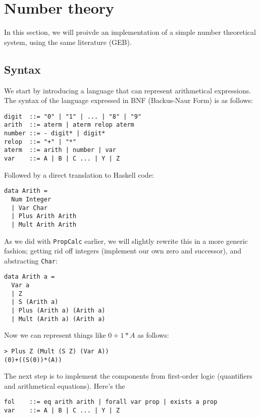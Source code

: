 \documentclass{article}
\begin{document}
\section{Number theory}

In this section, we will proivde an implementation of a simple number theoretical system, using the same literature (GEB).

\subsection{Syntax}

We start by introducing a language that can represent arithmetical expressions. The syntax of the language expressed in BNF (Backus-Naur Form) is as follows:

\begin{lstlisting}
digit  ::= "0" | "1" | ... | "8" | "9"
arith  ::= aterm | aterm relop aterm
number ::= - digit* | digit*
relop  ::= "+" | "*"
aterm  ::= arith | number | var
var    ::= A | B | C ... | Y | Z
\end{lstlisting}

Followed by a direct translation to Haskell code:

\begin{lstlisting}
data Arith =
  Num Integer
  | Var Char
  | Plus Arith Arith
  | Mult Arith Arith
\end{lstlisting}

As we did with \texttt{PropCalc} earlier, we will slightly rewrite this in a more generic fashion; getting rid off integers (implement our own zero and successor), and abstracting \texttt{Char}:

\begin{lstlisting}
data Arith a =
  Var a
  | Z
  | S (Arith a)
  | Plus (Arith a) (Arith a)
  | Mult (Arith a) (Arith a)
\end{lstlisting}

Now we can represent things like $0 + 1*A$ as follows:

\begin{lstlisting}
> Plus Z (Mult (S Z) (Var A))
(0)+((S(0))*(A))
\end{lstlisting}

The next step is to implement the components from first-order logic (quantifiers and arithmetical equations). Here's the 

\begin{lstlisting}
fol    ::= eq arith arith | forall var prop | exists a prop
var    ::= A | B | C ... | Y | Z
\end{lstlisting}
\end{document}
